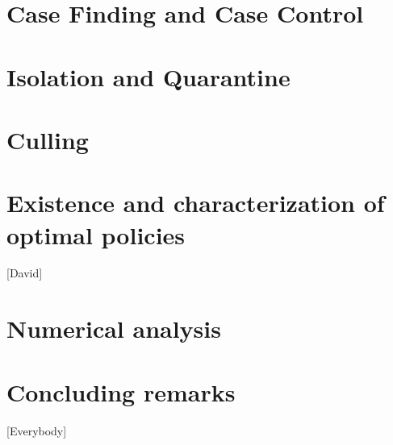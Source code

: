 \documentclass[a4paper]{amsart}
\begin{document}
      \section{Case Finding and Case Control}
        
      \section{Isolation and Quarantine}
        
      \section{Culling}
        
  \section{Existence and characterization of optimal policies}
    [David]
  \section{Numerical analysis}
    
  \section{Concluding remarks}
    [Everybody]
%
  
  
\end{document}
